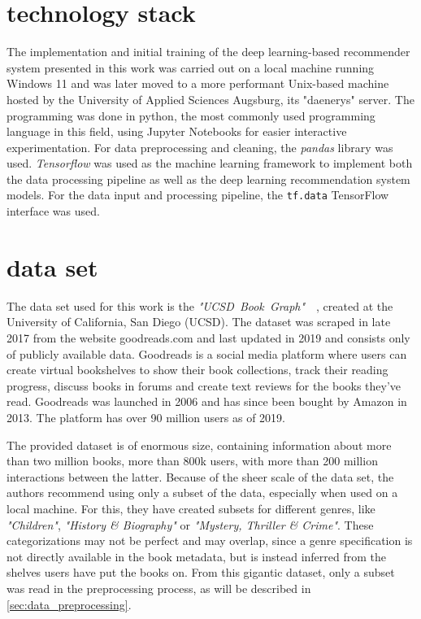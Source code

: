 \documentclass[10pt,final,journal,a4paper,oneside,twocolumn]{IEEEtran}
\begin{document}
\section{technology stack}
The implementation and initial training of the deep learning-based recommender system presented in this work was carried out on a local machine running Windows 11 and was later moved to a more performant Unix-based machine hosted by the University of Applied Sciences Augsburg, its "daenerys" server.
The programming was done in python, the most commonly used programming language in this field, using Jupyter Notebooks for easier interactive experimentation. For data preprocessing and cleaning, the \emph{pandas} library was used.
\emph{Tensorflow} was used as the machine learning framework to implement both the data processing pipeline as well as the deep learning recommendation system models. For the data input and processing pipeline, the \texttt{tf.data} TensorFlow interface was used.


\section{data set}\label{sec:data}
The data set used for this work is the \emph{"UCSD~Book~Graph"}~\cite{Wan.2018}~\cite{Wan.2019}, created at the University of California, San Diego (UCSD).
The dataset was scraped in late 2017 from the website goodreads.com and last updated in 2019 and consists only of publicly available data. Goodreads is a social media platform where users can create virtual bookshelves to show their book collections, track their reading progress, discuss books in forums and create text reviews for the books they've read. Goodreads was launched in 2006 and has since been bought by Amazon in 2013. The platform has over 90 million users as of 2019.

The provided dataset is of enormous size, containing information about more than two million books, more than 800k users, with more than 200 million interactions between the latter.
Because of the sheer scale of the data set, the authors recommend using only a subset of the data, especially when used on a local machine. For this, they have created subsets for different genres, like \emph{"Children"}, \emph{"History \& Biography"} or \emph{"Mystery, Thriller \& Crime"}. These categorizations may not be perfect and may overlap, since a genre specification is not directly available in the book metadata, but is instead inferred from the shelves users have put the books on.
From this gigantic dataset, only a subset was read in the preprocessing process, as will be described in \autoref{sec:data_preprocessing}.
\end{document}
